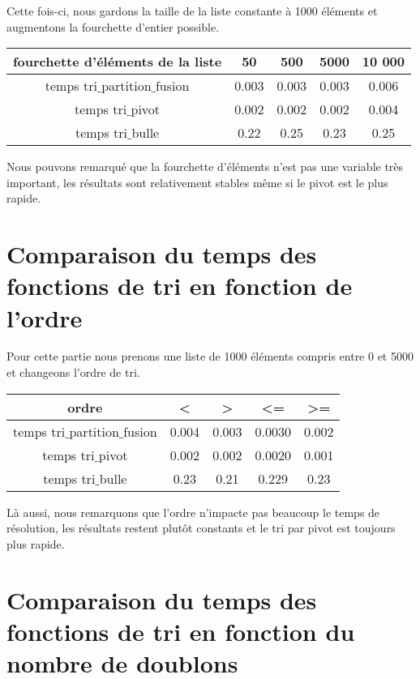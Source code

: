 \documentclass[a4paper, 12pt]{article}
\begin{document}
Cette fois-ci, nous gardons la taille de la liste constante à 1000 éléments et augmentons la fourchette d'entier possible. 
\begin{center}
\begin{tabular}{|c|c|c|c|c|}
\hline 
fourchette d'éléments de la liste & 50 & 500 & 5000 & 10 000 \\ 
\hline 
temps tri$\_$partition$\_$fusion & 0.003 & 0.003 & 0.003& 0.006 \\ 
\hline 
temps tri$\_$pivot & 0.002 & 0.002 & 0.002 & 0.004\\ 
\hline 
temps tri$\_$bulle & 0.22 & 0.25 & 0.23 & 0.25 \\ 
\hline 
\end{tabular} 
\end{center}

Nous pouvons remarqué que la fourchette d'éléments n'est pas une variable très important, les résultats sont relativement stables même si le pivot est le plus rapide.

\section{Comparaison du temps des fonctions de tri en fonction de l'ordre} 

Pour cette partie nous prenons une liste de 1000 éléments compris entre 0 et 5000 et changeons l'ordre de tri. 
\begin{center}
\begin{tabular}{|c|c|c|c|c|}
\hline 
ordre & < & > & <= & >= \\ 
\hline 
temps tri$\_$partition$\_$fusion & 0.004 & 0.003 &0.0030 & 0.002 \\ 
\hline 
temps tri$\_$pivot & 0.002 & 0.002 & 0.0020 & 0.001\\ 
\hline 
temps tri$\_$bulle & 0.23 & 0.21 & 0.229 & 0.23 \\ 
\hline  
\end{tabular}
\end{center} 

Là aussi, nous remarquons que l'ordre n'impacte pas beaucoup le temps de résolution, les résultats restent plutôt constants et le tri par pivot est toujours plus rapide.  

\section{Comparaison du temps des fonctions de tri en fonction du nombre de doublons}
\end{document}
